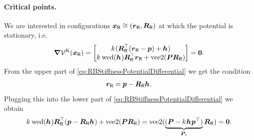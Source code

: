 \paragraph{Critical points.}
We are interested in configurations $\boldsymbol{x}_{\mathsf{R}}\cong (\boldsymbol{r}_{\mathsf{R}}, \boldsymbol{R}_{\mathsf{R}})$ at which the potential is stationary, i.e.
\begin{align}\label{eq:RBStiffnessPotentialDifferential}
\differential \potentialStiff(\sysCoordR)
 = \begin{bmatrix} \bodyStiffness{}{} (\RR^\top (\rR - \tuple{p}) + \bodyCOS{}{}) \\ \bodyStiffness{}{} \wedOp(\bodyCOS{}{}) \RR^\top \rR + \veeTwoOp(\mat{P} \RR) \end{bmatrix} = \tuple{0}
 .
\end{align}
From the upper part of \eqref{eq:RBStiffnessPotentialDifferential} we get the condition
\begin{align}
 \rR = \tuple{p} - \RR \bodyCOS{}{}.
\end{align}
Plugging this into the lower part of \eqref{eq:RBStiffnessPotentialDifferential} we obtain
\begin{align}
 \bodyStiffness{}{} \wedOp(\bodyCOS{}{}) \RR^\top (\tuple{p} - \RR \bodyCOS{}{}) + \veeTwoOp(\mat{P} \RR)
 = \veeTwoOp(\underbrace{(\mat{P} - \bodyStiffness{}{}\bodyCOS{}{}\tuple{p}^\top)}_{\mat{P}_{\!s}} \RR ) = \tuple{0}.
\end{align}
